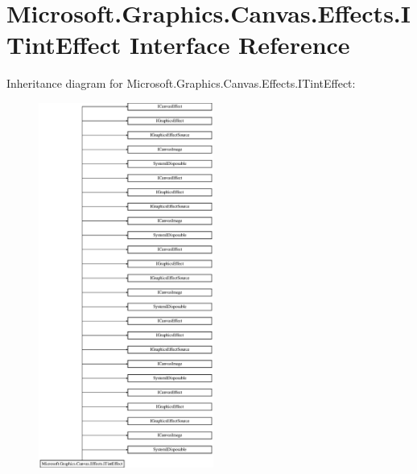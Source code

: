 \hypertarget{interface_microsoft_1_1_graphics_1_1_canvas_1_1_effects_1_1_i_tint_effect}{}\section{Microsoft.\+Graphics.\+Canvas.\+Effects.\+I\+Tint\+Effect Interface Reference}
\label{interface_microsoft_1_1_graphics_1_1_canvas_1_1_effects_1_1_i_tint_effect}
Inheritance diagram for Microsoft.\+Graphics.\+Canvas.\+Effects.\+I\+Tint\+Effect\+:\begin{figure}[H]
\begin{center}
\leavevmode
\includegraphics[height=12.000000cm]{interface_microsoft_1_1_graphics_1_1_canvas_1_1_effects_1_1_i_tint_effect}
\end{center}
\end{figure}
